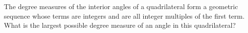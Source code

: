 The degree measures of the interior angles of a quadrilateral form a geometric sequence whose terms are integers and are all integer multiples of the first term. What is the largest possible degree measure of an angle in this quadrilateral?
